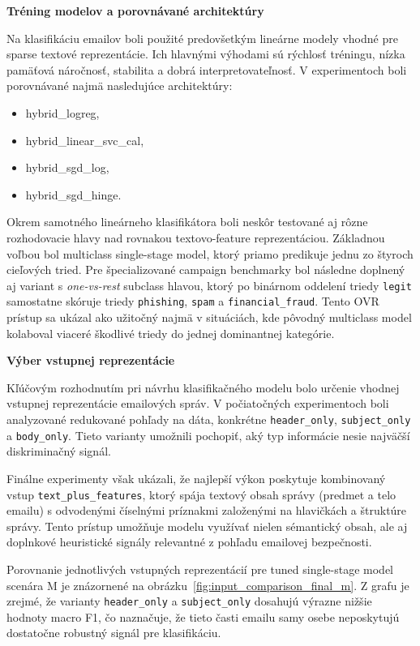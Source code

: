 \documentclass[conference]{IEEEtran}
\begin{document}
\textbf{Tréning modelov a porovnávané architektúry}

Na klasifikáciu emailov boli použité predovšetkým lineárne modely vhodné pre sparse textové reprezentácie. Ich hlavnými výhodami sú rýchlosť tréningu, nízka pamäťová náročnosť, stabilita a dobrá interpretovateľnosť. V experimentoch boli porovnávané najmä nasledujúce architektúry:

\begin{itemize}
    \item hybrid\_logreg,
    \item hybrid\_linear\_svc\_cal,
    \item hybrid\_sgd\_log,
    \item hybrid\_sgd\_hinge.
\end{itemize}

Okrem samotného lineárneho klasifikátora boli neskôr testované aj rôzne rozhodovacie hlavy nad rovnakou textovo-feature reprezentáciou. Základnou voľbou bol multiclass single-stage model, ktorý priamo predikuje jednu zo štyroch cieľových tried. Pre špecializované campaign benchmarky bol následne doplnený aj variant s \textit{one-vs-rest} subclass hlavou, ktorý po binárnom oddelení triedy \texttt{legit} samostatne skóruje triedy \texttt{phishing}, \texttt{spam} a \texttt{financial\_fraud}. Tento OVR prístup sa ukázal ako užitočný najmä v situáciách, kde pôvodný multiclass model kolaboval viaceré škodlivé triedy do jednej dominantnej kategórie.

\textbf{Výber vstupnej reprezentácie}

Kľúčovým rozhodnutím pri návrhu klasifikačného modelu bolo určenie vhodnej vstupnej reprezentácie emailových správ. V počiatočných experimentoch boli analyzované redukované pohľady na dáta, konkrétne \texttt{header\_only}, \texttt{subject\_only} a \texttt{body\_only}. Tieto varianty umožnili pochopiť, aký typ informácie nesie najväčší diskriminačný signál.

Finálne experimenty však ukázali, že najlepší výkon poskytuje kombinovaný vstup \texttt{text\_plus\_features}, ktorý spája textový obsah správy (predmet a telo emailu) s odvodenými číselnými príznakmi založenými na hlavičkách a štruktúre správy. Tento prístup umožňuje modelu využívať nielen sémantický obsah, ale aj doplnkové heuristické signály relevantné z pohľadu emailovej bezpečnosti.

Porovnanie jednotlivých vstupných reprezentácií pre tuned single-stage model scenára M je znázornené na obrázku~\ref{fig:input_comparison_final_m}. Z grafu je zrejmé, že varianty \texttt{header\_only} a \texttt{subject\_only} dosahujú výrazne nižšie hodnoty macro F1, čo naznačuje, že tieto časti emailu samy osebe neposkytujú dostatočne robustný signál pre klasifikáciu.
\end{document}
